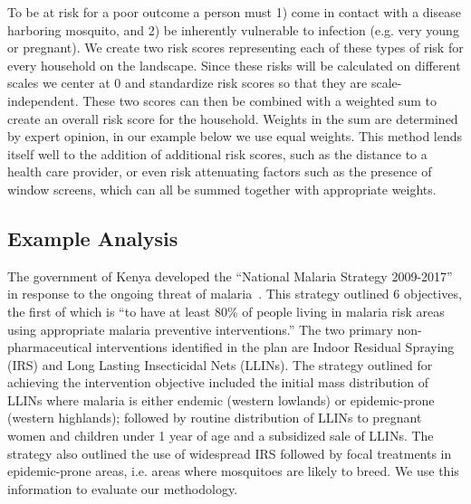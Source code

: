 \documentclass[10pt,letterpaper]{article}\usepackage[]{graphicx}\usepackage[]{color}
\begin{document}
To be at risk for a poor outcome a person must 1) come in contact with a disease harboring mosquito,  and 2) be inherently vulnerable to infection (e.g. very young or pregnant).  We create two risk scores representing each of these types of risk for every household on the landscape.  Since these risks will be calculated on different scales we center at 0 and standardize risk scores so that they are scale-independent.  These two scores can then be combined with a weighted sum to create an overall risk score for the household.  Weights in the sum are determined by expert opinion, in our example below we use equal weights.  This method lends itself well to the addition of additional risk scores, such as the distance to a health care provider, or even risk attenuating factors such as the presence of window screens, which can all be summed together with appropriate weights. 









\subsection{Example Analysis}

The government of Kenya developed the “National Malaria Strategy 2009-2017” in response to the ongoing threat of malaria~\cite{Ministryofpublichealthandsanitation2009}. This strategy outlined 6 objectives,  the first of which is “to have at least 80\% of people living in malaria risk areas using appropriate malaria preventive interventions.” The two primary non-pharmaceutical interventions identified in the plan are Indoor Residual Spraying (IRS) and Long Lasting Insecticidal Nets (LLINs). The strategy outlined for achieving the intervention objective included the initial mass distribution of LLINs where malaria is either endemic (western lowlands) or epidemic-prone (western highlands); followed by routine distribution of LLINs to pregnant women and children under 1 year of age and a subsidized sale of LLINs. The strategy also outlined the use of widespread IRS followed by focal treatments in epidemic-prone areas, i.e. areas where mosquitoes are likely to breed.  We use this information to evaluate our methodology.\\

\end{document}
